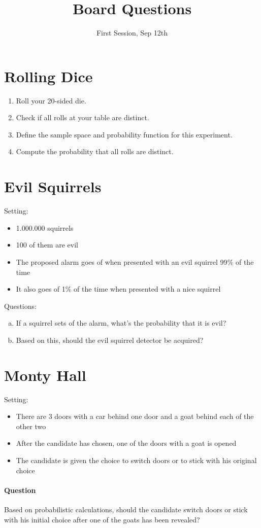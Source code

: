 \documentclass[11p,a4paper]{article}
\title{Board Questions}
\date{First Session, Sep 12th}
\begin{document}
\maketitle

\section{Rolling Dice}
\begin{enumerate}
\item Roll your 20-sided die.
\item Check if all rolls at your table are distinct.
\item Define the sample space and probability function for this experiment.
\item Compute the probability that all rolls are distinct.
\end{enumerate}

\section{Evil Squirrels}
Setting:
\begin{itemize}
\item 1.000.000 squirrels
\item 100 of them are evil
\item The proposed alarm goes of when presented with an evil squirrel 99$\%$ of the time
\item It also goes of 1$\%$ of the time when presented with a nice squirrel
\end{itemize}

Questions:
\begin{enumerate}[a)]
\item If a squirrel sets of the alarm, what's the probability that it is evil?
\item Based on this, should the evil squirrel detector be acquired?
\end{enumerate}

\section{Monty Hall}
Setting:
\begin{itemize}
\item There are 3 doors with a car behind one door and a goat behind each of the other two
\item After the candidate has chosen, one of the doors with a goat is opened
\item The candidate is given the choice to switch doors or to stick with his original choice
\end{itemize}
\paragraph{Question} Based on probabilistic calculations, should the candidate switch doors or 
stick with his initial choice after one of the goats has been revealed?
\end{document}
